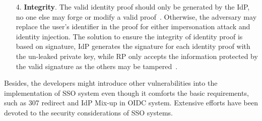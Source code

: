\begin{itemize}
\item[4.] \textbf{Integrity}. The valid identity proof should only be generated by the IdP, no one else may forge or modify a valid proof~\cite{WangZLG16}. Otherwise, the adversary may replace the user's identifier in the proof for either impersonation attack and identity injection. 
        The solution to ensure the integrity of identity proof is based on signature, IdP generates the signature  for each identity proof with the un-leaked private key, while RP  only accepts the information protected by the valid signature as the others may be tampered~\cite{WangCW12, SomorovskyMSKJ12}.
\end{itemize}

Besides, the developers might introduce other vulnerabilities into the implementation of SSO system even though it comforts the basic requirements, such as 307 redirect and IdP Mix-up in OIDC system. Extensive efforts have been devoted to the security considerations of SSO systems.

